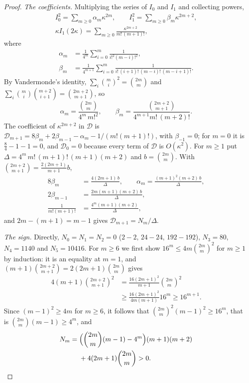 \documentclass[aps,prd,twocolumn,superscriptaddress,nofootinbib,longbibliography,floatfix,amsmath,amssymb,10pt]{revtex4-2}
\theoremstyle{definition}
\theoremstyle{remark}
\begin{document}
\begin{proof}
\emph{The coefficients.} Multiplying the series of $I_0$ and $I_1$ and
collecting powers,
\[
\begin{gathered}
I_0^2=\sum_{m\ge0}\alpha_m\kappa^{2m},\qquad I_1^2=\sum_{m\ge0}\beta_m
\kappa^{2m+2},\\
\kappa I_1(2\kappa)=\sum_{m\ge0}\frac{\kappa^{2m+2}}{m!\,(m+1)!},
\end{gathered}
\]
where
\[
\begin{aligned}
\alpha_m&=\frac1{4^m}\sum_{i=0}^m\frac1{i!^2(m-i)!^2},\\
\beta_m&=\frac1{4^{m+1}}\sum_{i=0}^m\frac1{i!\,(i+1)!\,(m-i)!\,(m-i+1)!}.
\end{aligned}
\]
By Vandermonde's identity, $\sum_i\binom mi^2=\binom{2m}m$ and
$\sum_i\binom mi\binom{m+2}{i+1}=\binom{2m+2}{m+1}$, so
\[
\alpha_m=\frac{\binom{2m}m}{4^m\,m!^2},\qquad\beta_m=\frac{\binom{2m+2}{m+1}}
{4^{m+1}m!\,(m+2)!}.
\]
The coefficient of $\kappa^{2m+2}$ in $\mathcal D$ is $\mathcal D_{m+1}=8\beta_m
+2\beta_{m-1}-\alpha_m-1/(m!(m+1)!)$, with $\beta_{-1}=0$; for $m=0$ it is
$\frac84-1-1=0$, and $\mathcal D_0=0$ because every term of $\mathcal D$ is
$O(\kappa^2)$. For $m\ge1$ put $\Delta=4^m\,m!\,(m+1)!\,(m+1)(m+2)$ and
$b=\binom{2m}m$. With $\binom{2m+2}{m+1}=\frac{2(2m+1)}{m+1}b$,
\[
\begin{aligned}
8\beta_m&=\frac{4(2m+1)\,b}\Delta,\qquad\alpha_m=\frac{(m+1)^2(m+2)\,b}\Delta,\\
2\beta_{m-1}&=\frac{2m(m+1)(m+2)\,b}\Delta,\\
\frac1{m!(m+1)!}&=\frac{4^m(m+1)(m+2)}\Delta,
\end{aligned}
\]
and $2m-(m+1)=m-1$ gives $\mathcal D_{m+1}=N_m/\Delta$.

\emph{The sign.} Directly, $N_0=N_1=N_2=0$ ($2-2$, $24-24$, $192-192$),
$N_3=80$, $N_4=1140$ and $N_5=10416$. For $m\ge6$ we first show
$16^m\le4m\binom{2m}m^2$ for $m\ge1$ by induction: it is an equality at
$m=1$, and $(m+1)\binom{2m+2}{m+1}=2(2m+1)\binom{2m}m$ gives
\[
\begin{aligned}
4(m+1)\binom{2m+2}{m+1}^2&=\frac{16(2m+1)^2}{m+1}\binom{2m}m^2\\
&\ge\frac{16(2m+1)^2}{4m(m+1)}16^m\ge16^{m+1}.
\end{aligned}
\]
Since $(m-1)^2\ge4m$ for $m\ge6$, it follows that $\binom{2m}m^2(m-1)^2\ge
16^m$, that is $\binom{2m}m(m-1)\ge4^m$, and
\[
\begin{aligned}
N_m={}&\Bigl(\binom{2m}m(m-1)-4^m\Bigr)(m+1)(m+2)\\
&+4(2m+1)\binom{2m}m>0 .
\end{aligned}
\]
\end{proof}
\end{document}
